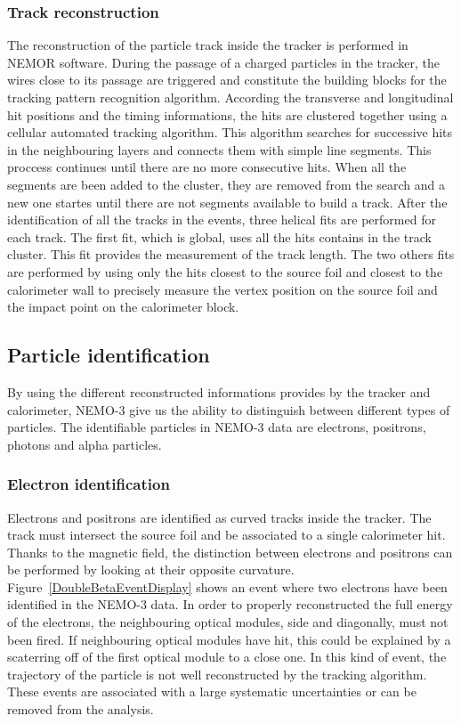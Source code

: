 \documentclass[main.tex]{subfiles}
\begin{document}
\subsubsection{Track reconstruction}


\NI The reconstruction of the particle track inside the tracker is performed in NEMOR software. During the passage of a charged particles in the tracker, the wires close to its passage are triggered and constitute the building blocks for the tracking pattern recognition algorithm. According the transverse and longitudinal hit positions and the timing informations, the hits are clustered together using a cellular automated tracking algorithm. This algorithm searches for successive hits in the neighbouring layers and connects them with simple line segments. This proccess continues until there are no more consecutive hits. When all the segments are been added to the cluster, they are removed from the search and a new one startes until there are not segments available to build a track. After the identification of all the tracks in the events, three helical fits are performed for each track. The first fit, which is global, uses all the hits contains in the track cluster. This fit provides the measurement of the track length. The two others fits are performed by using only the hits closest to the source foil and closest to the calorimeter wall to precisely measure the vertex position on the source foil and the impact point on the calorimeter block.


\subsection{Particle identification}\label{sec:PIDanalysis}


\NI By using the different reconstructed informations provides by the tracker and calorimeter, NEMO-3 give us the ability to distinguish between different types of particles. The identifiable particles in NEMO-3 data are electrons, positrons, photons and alpha particles.


\subsubsection{Electron identification}


\NI Electrons and positrons are identified as curved tracks inside the tracker. The track must intersect the source foil and be associated to a single calorimeter hit. Thanks to the magnetic field, the distinction between electrons and positrons can be performed by looking at their opposite curvature. Figure~\ref{DoubleBetaEventDisplay} shows an event where two electrons have been identified in the NEMO-3 data. In order to properly reconstructed the full energy of the electrons, the neighbouring optical modules, side and diagonally, must not been fired. If neighbouring optical modules have hit, this could be explained by a scaterring off of the first optical module to a close one. In this kind of event, the trajectory of the particle is not well reconstructed by the tracking algorithm. These events are associated with a large systematic uncertainties or can be removed from the analysis.
\end{document}
